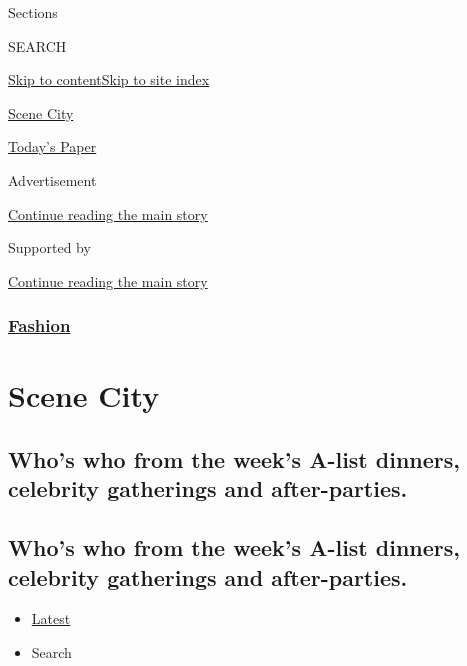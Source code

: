 Sections

SEARCH

\protect\hyperlink{site-content}{Skip to
content}\protect\hyperlink{site-index}{Skip to site index}

\href{https://www.nytimes3xbfgragh.onion/column/scene-city}{Scene City}

\href{https://myaccount.nytimes3xbfgragh.onion/auth/login?response_type=cookie\&client_id=vi}{}

\href{https://www.nytimes3xbfgragh.onion/section/todayspaper}{Today's
Paper}

Advertisement

\protect\hyperlink{after-top}{Continue reading the main story}

Supported by

\protect\hyperlink{after-sponsor}{Continue reading the main story}

\hypertarget{fashion}{%
\subsubsection{\texorpdfstring{\href{/section/fashion}{Fashion}}{Fashion}}\label{fashion}}

\hypertarget{scene-city}{%
\section{Scene City}\label{scene-city}}

\hypertarget{whos-who-from-the-weeks-a-list-dinners-celebrity-gatherings-and-after-parties}{%
\subsection{Who's who from the week's A-list dinners, celebrity
gatherings and
after-parties.}\label{whos-who-from-the-weeks-a-list-dinners-celebrity-gatherings-and-after-parties}}

\hypertarget{whos-who-from-the-weeks-a-list-dinners-celebrity-gatherings-and-after-parties-1}{%
\subsection{Who's who from the week's A-list dinners, celebrity
gatherings and
after-parties.}\label{whos-who-from-the-weeks-a-list-dinners-celebrity-gatherings-and-after-parties-1}}

\begin{itemize}
\tightlist
\item
  \protect\hyperlink{stream-panel}{Latest}
\item
  Search
\end{itemize}

